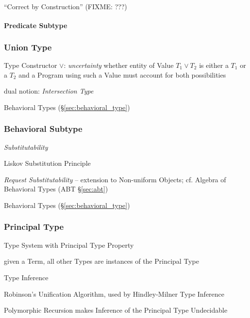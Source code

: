 ``Correct by Construction'' (FIXME: ???)



\paragraph{Predicate Subtype}\label{sec:predicate_subtype}\hfill



\subsubsection{Union Type}\label{sec:union_type}

Type Constructor $\vee$: \emph{uncertainty} whether entity of Value
$T_1 \vee T_2$ is either a $T_1$ or a $T_2$ and a Program using such a
Value must account for both possibilities


dual notion: \emph{Intersection Type}

\fist Behavioral Types (\S\ref{sec:behavioral_type})



\subsubsection{Behavioral Subtype}\label{sec:behavioral_subtype}

\emph{Substitutability}

Liskov Substitution Principle

\emph{Request Substitutability} -- extension to Non-uniform Objects;
cf. Algebra of Behavioral Types (ABT \S\ref{sec:abt})

\fist Behavioral Types (\S\ref{sec:behavioral_type})



\subsubsection{Principal Type}\label{sec:principal_type}

Type System with Principal Type Property

given a Term, all other Types are instances of the Principal Type

Type Inference

Robinson's Unification Algorithm, used by Hindley-Milner Type
Inference

Polymorphic Recursion makes Inference of the Principal Type Undecidable

